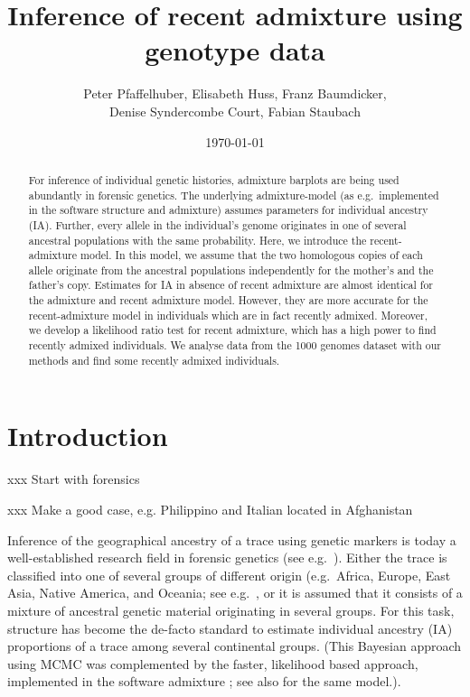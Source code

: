 \documentclass[12pt]{article}
\theoremstyle{definition}
\begin{document}
\title{\LARGE Inference of recent admixture using genotype data}

\author{\sc Peter Pfaffelhuber, Elisabeth Huss, Franz Baumdicker, \\
  \sc Denise Syndercombe Court, Fabian Staubach}

\date{\today}

\maketitle

\begin{abstract}
  For inference of individual genetic histories, admixture barplots
  are being used abundantly in forensic genetics. The underlying
  admixture-model (as e.g.\ implemented in the software {\sc
    structure} and {\sc admixture}) assumes parameters for individual
  ancestry (IA). Further, every allele in the individual's genome
  originates in one of several ancestral populations with the same
  probability. Here, we introduce the recent-admixture model. In this
  model, we assume that the two homologous copies of each allele
  originate from the ancestral populations independently for the
  mother's and the father's copy. Estimates for IA in absence of
  recent admixture are almost identical for the admixture and recent
  admixture model. However, they are more accurate for the
  recent-admixture model in individuals which are in fact recently
  admixed.  Moreover, we develop a likelihood ratio test for recent
  admixture, which has a high power to find recently admixed
  individuals. We analyse data from the 1000 genomes dataset with our
  methods and find some recently admixed individuals.
\end{abstract}

\section{Introduction}
xxx Start with forensics

xxx Make a good case, e.g. Philippino and Italian located in
Afghanistan

Inference of the geographical ancestry of a trace using genetic
markers is today a well-established research field in forensic
genetics (see e.g.\ \cite{Phillips2016, Eduardoff2016,
  Kidd2017}). Either the trace is classified into one of several
groups of different origin (e.g.\ Africa, Europe, East Asia, Native
America, and Oceania; see e.g.\ \cite{Snipper2007, Pfaffelhuber2019},
or it is assumed that it consists of a mixture of ancestral genetic
material originating in several groups. For this task, {\sc structure}
\cite{Pritchard2000} has become the de-facto standard to estimate
individual ancestry (IA) proportions of a trace among several
continental groups. (This Bayesian approach using MCMC was
complemented by the faster, likelihood based approach, implemented in
the software {\sc admixture} \cite{Alexander2009}; see also
\cite{Tang2005} for the same model.).
\end{document}
